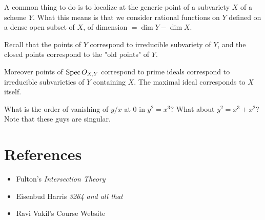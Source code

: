 \documentclass[12pt]{article}
\begin{document}
A common thing to do is to localize at the generic point of a subvariety $X$ of a scheme $Y$.
What this means is that we consider rational functions on $Y$ defined on a dense open subset of $X$,
of dimension $ = \dim Y - \dim X$.

\hfill

Recall that the points of $Y$ correspond to irreducible subvariety of $Y$, and the closed 
points correspond to the "old points" of $Y$. 

\hfill

Moreover points of $\operatorname{Spec} O_{X,Y}$ correspond to prime ideals correspond to irreducible subvarieties
of $Y$ containing $X$. The maximal ideal corresponds to $X$ itself.

\begin{example}
    What is the order of vanishing of $y/x$ at $0$ in $y^2 = x^3$?
    What about $y^2 = x^3 + x^2$?
    Note that these guys are singular.
\end{example}

\section{References}
\begin{itemize}
    \item Fulton's \textit{Intersection Theory}
    \item Eisenbud Harris \textit{3264 and all that}
    \item Ravi Vakil's Course Website
\end{itemize}
\end{document}
